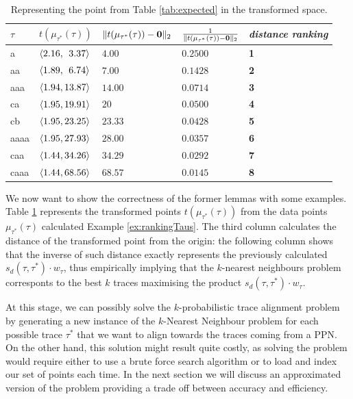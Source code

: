 \begin{table}[!t]
\centering
\caption{Representing the point from Table \ref{tab:expected} in the transformed space.}\label{tab:transf}
\begin{tabular}{ll|lll}
	\toprule
	
	$\tau$ & $t(\mu_{\tau^*}(\tau))$ & $\norm{t(\mu_{\tau^*}(\tau))-\vec{0}}{2}$ & $\frac{1}{\norm{t(\mu_{\tau^*}(\tau))-\vec{0}}{2}}$ & \textit{distance ranking}\\
	
	\midrule	
	a   & $\braket{2.16, \;\,3.37}$ & $4.00$ & $0.2500$ & \textbf{1}\\
	{aa}  & $\braket{1.89, \;\,6.74}$ & $7.00$ & $0.1428$ & \textbf{2}\\
	aaa   & $\braket{1.94, 13.87}$ & $14.00$ & $0.0714$ & \textbf{3}\\
	ca   & $\braket{1.95, 19.91}$ & $20$ & $0.0500$ & \textbf{4}\\
	{cb}  & $\braket{1.95, 23.25}$ & $23.33$ & $0.0428$ & \textbf{5}\\
aaaa   & $\braket{1.95, 27.93}$ & $28.00$ & $0.0357$ & \textbf{6}\\
caa   & $\braket{1.44, 34.26}$ & $34.29$ & $0.0292$ & \textbf{7}\\
caaa   & $\braket{1.44, 68.56}$ & $68.57$ & $0.0145$ & \textbf{8}\\
	\bottomrule
\end{tabular}
\end{table}
\begin{example}
We now want to show the correctness of the former lemmas with some examples. 
Table \ref{tab:transf} represents the transformed points $t(\mu_{\tau^*}(\tau))$ from the data points $\mu_{\tau^*}(\tau)$  calculated  Example \ref{ex:rankingTaus}. The third column calculates the distance of the transformed point from the origin: the following column shows that the inverse of such distance exactly represents the previously calculated $s_d(\tau,\tau^*)\cdot w_\tau$, thus empirically implying that the $k$-nearest neighbours problem corresponts to the best $k$ traces maximising the product $s_d(\tau,\tau^*)\cdot w_\tau$.
\end{example}





At this stage, we can possibly solve the $k$-probabilistic trace alignment problem by generating a new instance of the $k$-Nearest Neighbour problem for each possible trace $\tau^*$ that we want to align towards the traces coming from a PPN. On the other hand, this solution might result quite costly, as solving the problem would require either to use a brute force search algorithm or to load and index our set of points each time. In the next section we will discuss an approximated version of the problem providing a trade off between accuracy and efficiency.


